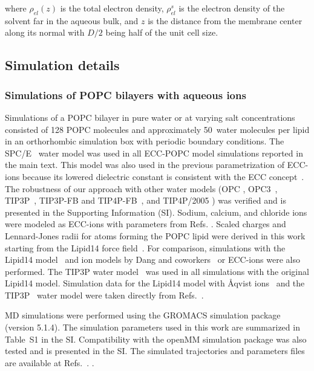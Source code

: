 \documentclass[journal=jpcbfk,manuscript=article]{achemso}
\begin{document}
\noindent where $\rho_{el} (z)$ is the total electron density, $\rho_{el}^s$ is the electron density of the solvent far in the aqueous bulk, and $z$ is the distance from the membrane center along its normal with $D/2$ being half of the unit cell size.  




\subsection{Simulation details}

\subsubsection{Simulations of POPC bilayers with aqueous ions}
Simulations of a POPC bilayer in pure water or at varying salt concentrations consisted of 128 POPC molecules
and approximately 50~water molecules per lipid in an orthorhombic simulation box with periodic boundary conditions.
The SPC/E~\cite{Berendsen1987} water model was used in all ECC-POPC model simulations reported
in the main text. This model was also used in the previous parametrization
of ECC-ions \cite{martinek17, kohagen16, Pluharova2014} because its lowered dielectric constant is consistent with
the ECC concept~\cite{leontyev11, leontyev14}.
The robustness of our approach with other water models (OPC \cite{Izadi14},
OPC3~\cite{Izadi16}, TIP3P~\cite{jorgensen83}, TIP3P-FB and TIP4P-FB~\cite{Wang2014}, and TIP4P/2005 \cite{Abascal2005})
was verified and is presented in the Supporting Information (SI).
Sodium, calcium, and chloride ions were modeled as ECC-ions
with parameters from Refs. . Scaled charges and Lennard-Jones radii for atoms
forming the POPC lipid were derived in this work starting from the Lipid14 force field~\cite{dickson14}.
For comparison, simulations with the Lipid14 model~\cite{dickson14} and
ion models by Dang and coworkers~\cite{smith94,chang1999,dang2006} or ECC-ions \cite{martinek17, kohagen16, Pluharova2014}
were also performed. The TIP3P water model~\cite{jorgensen83} was used in all simulations with the original Lipid14 model.
Simulation data for the Lipid14 model with \AA{}qvist ions~\cite{aqvist90} and the TIP3P~\cite{jorgensen83} water model were taken directly from
Refs.~.  

MD simulations were performed using the GROMACS \cite{Abraham15} simulation package (version 5.1.4). The simulation parameters used
in this work are summarized in Table~S1 in the SI. 
Compatibility with the openMM simulation package \cite{openmm7} was also
tested and is presented in the SI. 
The simulated trajectories and parameters files are available at
Refs.~.
.
\end{document}
